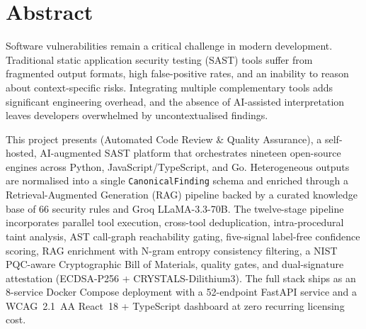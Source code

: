 \chapter*{Abstract}
\thispagestyle{plain}

Software vulnerabilities remain a critical challenge in modern development. Traditional static application security testing (SAST) tools suffer from fragmented output formats, high false-positive rates, and an inability to reason about context-specific risks. Integrating multiple complementary tools adds significant engineering overhead, and the absence of AI-assisted interpretation leaves developers overwhelmed by uncontextualised findings.

This project presents \textbf{\ACRQA{}} (Automated Code Review \& Quality Assurance), a self-hosted, AI-augmented SAST platform that orchestrates nineteen open-source engines across Python, JavaScript/TypeScript, and Go. Heterogeneous outputs are normalised into a single \texttt{CanonicalFinding} schema and enriched through a Retrieval-Augmented Generation (RAG) pipeline backed by a curated knowledge base of 66 security rules and Groq LLaMA-3.3-70B. The twelve-stage pipeline incorporates parallel tool execution, cross-tool deduplication, intra-procedural taint analysis, AST call-graph reachability gating, five-signal label-free confidence scoring, RAG enrichment with N-gram entropy consistency filtering, a NIST PQC-aware Cryptographic Bill of Materials, quality gates, and dual-signature attestation (ECDSA-P256 + CRYSTALS-Dilithium3). The full stack ships as an 8-service Docker Compose deployment with a 52-endpoint FastAPI service and a WCAG~2.1~AA React~18 + TypeScript dashboard at zero recurring licensing cost.

